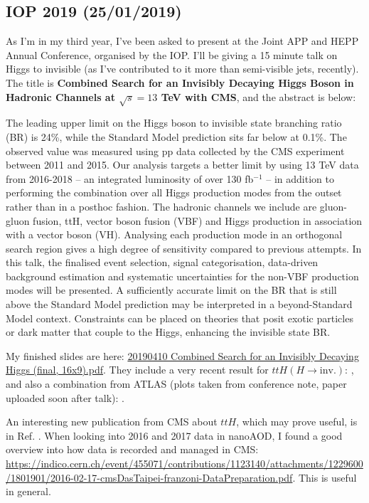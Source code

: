\subsection{IOP 2019 (25/01/2019)}

As I'm in my third year, I've been asked to present at the Joint APP and HEPP Annual Conference, organised by the IOP. I'll be giving a 15 minute talk on Higgs to invisible (as I've contributed to it more than semi-visible jets, recently). The title is \textbf{Combined Search for an Invisibly Decaying Higgs Boson in Hadronic Channels at $\sqrt{s} = 13$ TeV with CMS}, and the abstract is below:

The leading upper limit on the Higgs boson to invisible state branching ratio (BR) is 24\%, while the Standard Model prediction sits far below at 0.1\%. The observed value was measured using pp data collected by the CMS experiment between 2011 and 2015. Our analysis targets a better limit by using 13 TeV data from 2016-2018 -- an integrated luminosity of over 130 fb$^{-1}$ -- in addition to performing the combination over all Higgs production modes from the outset rather than in a posthoc fashion. The hadronic channels we include are gluon-gluon fusion, ttH, vector boson fusion (VBF) and Higgs production in association with a vector boson (VH). Analysing each production mode in an orthogonal search region gives a high degree of sensitivity compared to previous attempts. In this talk, the finalised event selection, signal categorisation, data-driven background estimation and systematic uncertainties for the non-VBF production modes will be presented. A sufficiently accurate limit on the BR that is still above the Standard Model prediction may be interpreted in a beyond-Standard Model context. Constraints can be placed on theories that posit exotic particles or dark matter that couple to the Higgs, enhancing the invisible state BR.

My finished slides are here: \href{run:./sec37/20190410 Combined Search for an Invisibly Decaying Higgs (final, 16x9).pdf}{20190410 Combined Search for an Invisibly Decaying Higgs (final, 16x9).pdf}. They include a very recent result for $ttH (H \rightarrow \mathrm{inv.})$: \cite{CMS-PAS-HIG-18-008}, and also a combination from ATLAS (plots taken from conference note, paper uploaded soon after talk): \cite{Aaboud:2019rtt}.


An interesting new publication from CMS about $ttH$, which may prove useful, is in Ref. \cite{PhysRevLett.120.231801}.
When looking into 2016 and 2017 data in nanoAOD, I found a good overview into how data is recorded and managed in CMS: \url{https://indico.cern.ch/event/455071/contributions/1123140/attachments/1229600/1801901/2016-02-17-cmsDasTaipei-franzoni-DataPreparation.pdf}. This is useful in general.
